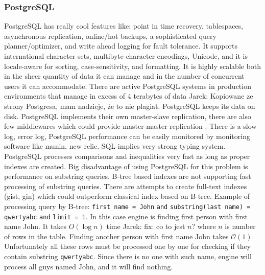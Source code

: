 \documentclass[10pt,a4paper]{article}
\newcommand{\jarek}[1]{\noindent\colorbox{myYellow}{Jarek: #1}}
\newcommand{\Oh}{\mathcal{O}}
\begin{document}
\subsubsection{PostgreSQL}
PostgreSQL has really cool features like: point in time recovery, tablespaces, asynchronous replication, online/hot backups, a sophisticated query planner/optimizer, and write ahead logging for fault tolerance. It supports international character sets, multibyte character encodings, Unicode, and it is locale-aware for sorting, case-sensitivity, and formatting. It is highly scalable both in the sheer quantity of data it can manage and in the number of concurrent users it can accommodate. There are active PostgreSQL systems in production environments that manage in excess of 4 terabytes of data \jarek{Kopiowane ze strony Postgresa, mam nadzieje, że to nie plagiat}.
PostgreSQL keeps its data on disk. PostgreSQL implements their own master-slave replication, there are also few middlewares which could provide master-master replication \cite{PSQLREPL}. There is a slow log, error log, PostgreSQL performance can be easily monitored by monitoring software like munin, new relic. SQL implies very strong typing system. PostgreSQL processes comparisons and inequalities very fast as long as proper indexes are created. Big disadvantage of using PostgreSQL for this problem is performance on substring queries. B-tree based indexes are not supporting fast processing of substring queries. There are attempts to create full-text indexes (gist, gin) which could outperform classical index based on B-tree.
Example of processing query by B-tree: \verb|first name = John| \verb|and| \verb|substring(last name) = qwertyabc| \verb|and| \verb|limit = 1|. In this case engine is finding first person with first name John. It takes $O(\log n)$ time \jarek{fix: co to jest $n$?} where $n$ is number of rows in the table. Finding another person with first name John takes $\Oh(1)$. Unfortunately all these rows must be processed one by one for checking if they contain substring \verb|qwertyabc|. Since there is no one with such name, engine will process all guys named John, and it will find nothing.
\end{document}
